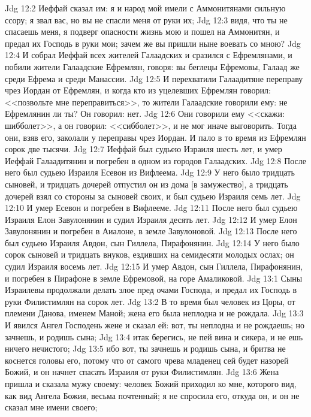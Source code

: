 \vs Jdg 12:2 Иеффай сказал им: я и народ мой имели с Аммонитянами сильную ссору; я звал вас, но вы не спасли меня от руки их;
\vs Jdg 12:3 видя, что ты не спасаешь меня, я подверг опасности жизнь мою и пошел на Аммонитян, и предал их Господь в руки мои; зачем же вы пришли ныне воевать со мною?
\vs Jdg 12:4 И собрал Иеффай всех жителей Галаадских и сразился с Ефремлянами, и побили жители Галаадские Ефремлян, говоря: вы беглецы Ефремовы, Галаад же среди Ефрема и среди Манассии.
\vs Jdg 12:5 И перехватили Галаадитяне переправу чрез Иордан от Ефремлян, и когда кто из уцелевших Ефремлян говорил: <<позвольте мне переправиться>>, то жители Галаадские говорили ему: не Ефремлянин ли ты? Он говорил: нет.
\vs Jdg 12:6 Они говорили ему <<скажи: шибболет>>, а он говорил: <<сибболет>>, и не мог иначе выговорить. Тогда они, взяв его, заколали у переправы чрез Иордан. И пало в то время из Ефремлян сорок две тысячи.
\rsbpar\vs Jdg 12:7 Иеффай был судьею Израиля шесть лет, и умер Иеффай Галаадитянин и погребен в одном из городов Галаадских.
\vs Jdg 12:8 После него был судьею Израиля Есевон из Вифлеема.
\vs Jdg 12:9 У него было тридцать сыновей, и тридцать дочерей отпустил он из дома [в замужество], а тридцать дочерей взял со стороны за сыновей своих, и был судьею Израиля семь лет.
\vs Jdg 12:10 И умер Есевон и погребен в Вифлееме.
\vs Jdg 12:11 После него был судьею Израиля Елон Завулонянин и судил Израиля десять лет.
\vs Jdg 12:12 И умер Елон Завулонянин и погребен в Аиалоне, в земле Завулоновой.
\vs Jdg 12:13 После него был судьею Израиля Авдон, сын Гиллела, Пирафонянин.
\vs Jdg 12:14 У него было сорок сыновей и тридцать внуков, ездивших на семидесяти молодых ослах; он судил Израиля восемь лет.
\vs Jdg 12:15 И умер Авдон, сын Гиллела, Пирафонянин, и погребен в Пирафоне в земле Ефремовой, на горе Амаликовой.
\vs Jdg 13:1 Сыны Израилевы продолжали делать злое пред очами Господа, и предал их Господь в руки Филистимлян на сорок лет.
\rsbpar\vs Jdg 13:2 В то время был человек из Цоры, от племени Данова, именем Маной; жена его была неплодна и не рождала.
\vs Jdg 13:3 И явился Ангел Господень жене и сказал ей: вот, ты неплодна и не рождаешь; но зачнешь, и родишь сына;
\vs Jdg 13:4 итак берегись, не пей вина и сикера, и не ешь ничего нечистого;
\vs Jdg 13:5 ибо вот, ты зачнешь и родишь сына, и бритва не коснется головы его, потому что от самого чрева младенец сей будет назорей Божий, и он начнет спасать Израиля от руки Филистимлян.
\vs Jdg 13:6 Жена пришла и сказала мужу своему: человек Божий приходил ко мне, которого вид, как вид Ангела Божия, весьма почтенный; я не спросила его, откуда он, и он не сказал мне имени своего;
